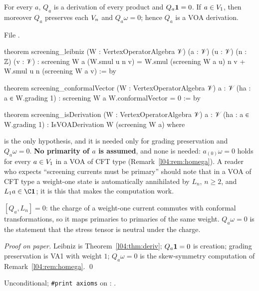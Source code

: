 \begin{theorem}\label{l04:thm:scrder}
For every $a$, $Q_a$ is a derivation of every product and $Q_a\mathbf{1} = 0$. If $a\in V_1$, then
moreover $Q_a$ preserves each $V_n$ and $Q_a\omega = 0$; hence $Q_a$ is a VOA derivation.
\end{theorem}
\noindent File .
\begin{leancode}
theorem screening_leibniz (W : VertexOperatorAlgebra 𝒱) (a : 𝒱) (u : 𝒱) (n : ℤ) (v : 𝒱) :
    screening W a (W.smul u n v)
      = W.smul (screening W a u) n v + W.smul u n (screening W a v) := by

theorem screening_conformalVector (W : VertexOperatorAlgebra 𝒱) {a : 𝒱}
    (ha : a ∈ W.grading 1) : screening W a W.conformalVector = 0 := by

theorem screening_isDerivation (W : VertexOperatorAlgebra 𝒱) {a : 𝒱}
    (ha : a ∈ W.grading 1) : IsVOADerivation W (screening W a) where
\end{leancode}
\begin{dictionary}
 is the only hypothesis, and it is needed only for grading preservation
and $Q_a\omega = 0$. \textbf{No primarity of $a$ is assumed}, and none is needed:
$a_{(0)}\omega = 0$ holds for every $a\in V_1$ in a VOA of CFT type (Remark~\ref{l04:rem:homega}). A
reader who expects ``screening currents must be primary'' should note that in a VOA of CFT type a
weight-one state is automatically annihilated by $L_n$, $n\ge2$, and $L_1a\in\C\lfourvac$; it is this
that makes the computation work.
\end{dictionary}
\begin{physics}
$[Q_a,L_n] = 0$: the charge of a weight-one current commutes with conformal transformations, so it
maps primaries to primaries of the same weight. $Q_a\omega = 0$ is the statement that the stress tensor
is neutral under the charge.
\end{physics}
\emph{Proof on paper.} Leibniz is Theorem~\ref{l04:thm:deriv}; $Q_a\mathbf{1} = 0$ is creation;
grading preservation is VA1 with weight $1$; $Q_a\omega = 0$ is the skew-symmetry computation of
Remark~\ref{l04:rem:homega}. \qed
\begin{status}
Unconditional; \texttt{\#print axioms} on \allowbreak{}: .
\end{status}

